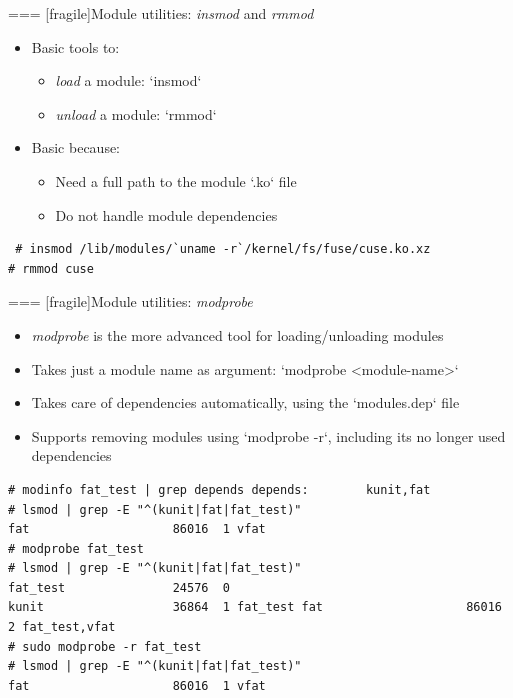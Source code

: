 === [fragile]{Module utilities: {\em insmod} and {\em rmmod}}
  \begin{itemize}
  \item Basic tools to:
    \begin{itemize}
    \item {\em load} a module: `insmod`
    \item {\em unload} a module: `rmmod`
    \end{itemize}
  \item Basic because:
    \begin{itemize}
    \item Need a full path to the module `.ko` file
    \item Do not handle module dependencies
    \end{itemize}
  \end{itemize}

  \begin{block}{}
    {\footnotesize
\begin{verbatim} # insmod /lib/modules/`uname -r`/kernel/fs/fuse/cuse.ko.xz
# rmmod cuse
\end{verbatim}
    }
  \end{block}


=== [fragile]{Module utilities: {\em modprobe}}
  \begin{itemize}
  \item {\em modprobe} is the more advanced tool for loading/unloading
    modules
  \item Takes just a module name as argument: `modprobe <module-name>`
  \item Takes care of dependencies automatically, using the
    `modules.dep` file
  \item Supports removing modules using `modprobe -r`, including
    its no longer used dependencies
  \end{itemize}

  \begin{block}{}
    {\footnotesize
\begin{verbatim}
# modinfo fat_test | grep depends depends:        kunit,fat
# lsmod | grep -E "^(kunit|fat|fat_test)"
fat                    86016  1 vfat
# modprobe fat_test
# lsmod | grep -E "^(kunit|fat|fat_test)"
fat_test               24576  0
kunit                  36864  1 fat_test fat                    86016  2 fat_test,vfat
# sudo modprobe -r fat_test
# lsmod | grep -E "^(kunit|fat|fat_test)"
fat                    86016  1 vfat
\end{verbatim}
    }
  \end{block}


